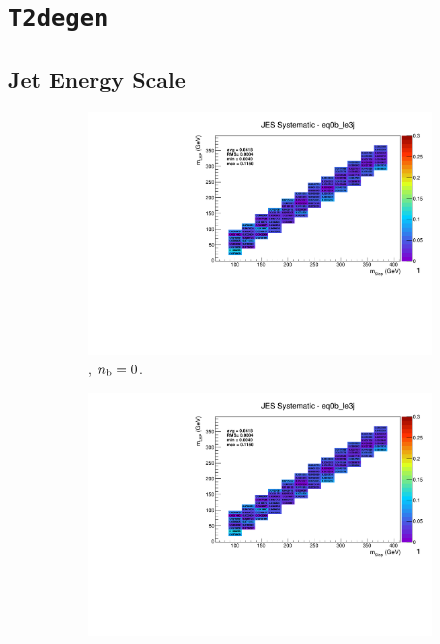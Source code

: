 \clearpage
\section*{\texttt{T2degen}}
\label{sec:t2degen_syst_plots}

\newpage
\subsection*{Jet Energy Scale}
\label{sec:t2degen_jes_plots}

\begin{figure}[ht!]
  \centering
  \begin{subfigure}[b]{0.32\textwidth}
    \includegraphics[width=\textwidth, page=12]{Figs/sms/t2degen/v19/systs_v2/T2_4body_JES_eq0b_le3j.pdf}
    \caption{\njlow, $n_{\text{b}} = 0$.}
  \end{subfigure}
  \begin{subfigure}[b]{0.32\textwidth}
    \includegraphics[width=\textwidth, page=8]{Figs/sms/t2degen/v19/systs_v2/T2_4body_JES_eq0b_le3j.pdf}

\end{subfigure}
\end{figure}
